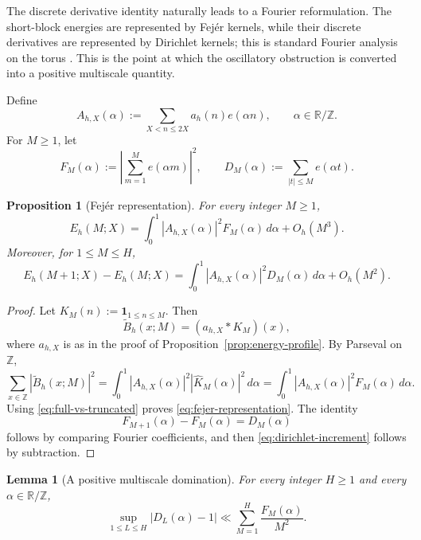 \documentclass[11pt]{scrartcl}
\numberwithin{equation}{section}
\newtheorem{proposition}[theorem]{Proposition}
\newtheorem{lemma}[theorem]{Lemma}
\theoremstyle{definition}
\newcommand{\Z}{\mathbb Z}
\newcommand{\R}{\mathbb R}
\newcommand{\1}{\mathbf 1}
\newcommand{\abs}[1]{\left|#1\right|}
\newcommand{\ee}[1]{e\!\left(#1\right)}
\begin{document}
The discrete derivative identity naturally leads to a Fourier reformulation. The short-block energies are represented by Fej\'er kernels, while their discrete derivatives are represented by Dirichlet kernels; this is standard Fourier analysis on the torus \cite{zygmund1959trigonometric,grafakos2008classical}. This is the point at which the oscillatory obstruction is converted into a positive multiscale quantity.

Define
\[
A_{h,X}(\alpha):=\sum_{X<n\le 2X}a_h(n)\ee{\alpha n},
\qquad \alpha\in \R/\Z.
\]
For $M\ge 1$, let
\[
F_M(\alpha):=\left|\sum_{m=1}^M \ee{\alpha m}\right|^2,
\qquad
D_M(\alpha):=\sum_{|t|\le M}\ee{\alpha t}.
\]

\begin{proposition}[Fej\'er representation]
\label{prop:fejer-representation}
For every integer $M\ge 1$,
\begin{equation}
\label{eq:fejer-representation}
E_h(M;X)=\int_0^1 \abs{A_{h,X}(\alpha)}^2F_M(\alpha)\,d\alpha+O_h(M^3).
\end{equation}
Moreover, for $1\le M\le H$,
\begin{equation}
\label{eq:dirichlet-increment}
E_h(M+1;X)-E_h(M;X)=\int_0^1 \abs{A_{h,X}(\alpha)}^2D_M(\alpha)\,d\alpha+O_h(M^2).
\end{equation}
\end{proposition}

\begin{proof}
Let $K_M(n):=\mathbf 1_{1\le n\le M}$. Then
\[
\widetilde B_h(x;M)=(a_{h,X}*K_M)(x),
\]
where $a_{h,X}$ is as in the proof of Proposition~\ref{prop:energy-profile}. By Parseval on $\Z$,
\[
\sum_{x\in\Z}\abs{\widetilde B_h(x;M)}^2
=\int_0^1\abs{A_{h,X}(\alpha)}^2\abs{\widehat K_M(\alpha)}^2\,d\alpha
=\int_0^1\abs{A_{h,X}(\alpha)}^2F_M(\alpha)\,d\alpha.
\]
Using \eqref{eq:full-vs-truncated} proves \eqref{eq:fejer-representation}. The identity
\[
F_{M+1}(\alpha)-F_M(\alpha)=D_M(\alpha)
\]
follows by comparing Fourier coefficients, and then \eqref{eq:dirichlet-increment} follows by subtraction.
\end{proof}

\begin{lemma}[A positive multiscale domination]
\label{lem:positive-domination}
For every integer $H\ge 1$ and every $\alpha\in\R/\Z$,
\begin{equation}
\label{eq:positive-domination}
\sup_{1\le L\le H}\abs{D_L(\alpha)-1}
\ll
\sum_{M=1}^H \frac{F_M(\alpha)}{M^2}.
\end{equation}
\end{lemma}
\end{document}
